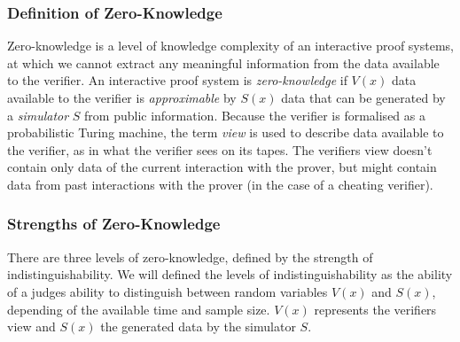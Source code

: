 %
%

\subsubsection{Definition of Zero-Knowledge}
Zero-knowledge is a level of knowledge complexity of an interactive proof systems, at which we cannot extract any meaningful information from the data available to the verifier.
\bigskip
\newline
An interactive proof system is \textit{zero-knowledge} if $V(x)$ data available to the verifier is \textit{approximable} by $S(x)$ data that can be generated by a \textit{simulator} $S$ from public information.
Because the verifier is formalised as a probabilistic Turing machine, the term \textit{view} is used to describe data available to the verifier, as in what the verifier sees on its tapes.
The verifiers view doesn't contain only data of the current interaction with the prover, but might contain data from past interactions with the prover (in the case of a cheating verifier).

\subsubsection{Strengths of Zero-Knowledge}
There are three levels of zero-knowledge, defined by the strength of indistinguishability. We will defined the levels of indistinguishability as the ability of a judges ability to distinguish between random variables $V(x)$ and $S(x)$, depending of the available time and sample size. $V(x)$ represents the verifiers view and $S(x)$ the generated data by the simulator $S$.

